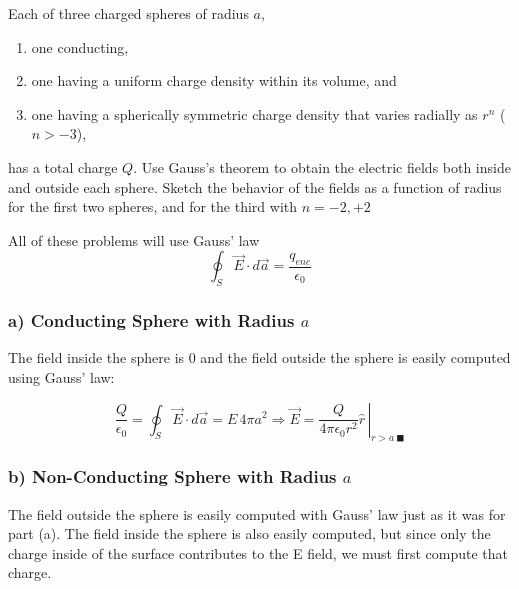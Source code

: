 \begin{question}

  Each of three charged spheres of radius $a$,

  \begin{enumerate}[label=(\alph*)]

  \item one conducting,

  \item one having a uniform charge density within its volume, and

  \item one having a spherically symmetric charge density that varies
    radially as $r^n$ ($n > -3$),

  \end{enumerate}
  has a total charge $Q$. Use Gauss's theorem to obtain the electric
  fields both inside and outside each sphere. Sketch the behavior of
  the fields as a function of radius for the first two spheres, and
  for the third with $n = -2, +2$

\end{question}

All of these problems will use Gauss' law
\begin{equation}
  \oint_S \vec{E} \cdot d\vec{a} = \frac{q_{enc}}{\epsilon_0}
\end{equation}


\subsubsection*{a) Conducting Sphere with Radius $a$}

The field inside the sphere is 0 and the field outside the sphere is
easily computed using Gauss' law:

\begin{equation}
  \frac{Q}{\epsilon_0}
  = \oint_S \vec{E} \cdot d\vec{a}
  = E \,4 \pi a^2
  \Rightarrow \vec{E} = \left. \frac{Q}{4 \pi \epsilon_0 r^2} \hat{r}\, \right|_{r>a\ \blacksquare}
\end{equation}



\subsubsection*{b) Non-Conducting Sphere with Radius $a$}

The field outside the sphere is easily computed with Gauss' law just
as it was for part (a).  The field inside the sphere is also easily
computed, but since only the charge inside of the surface contributes
to the E field, we must first compute that charge.

